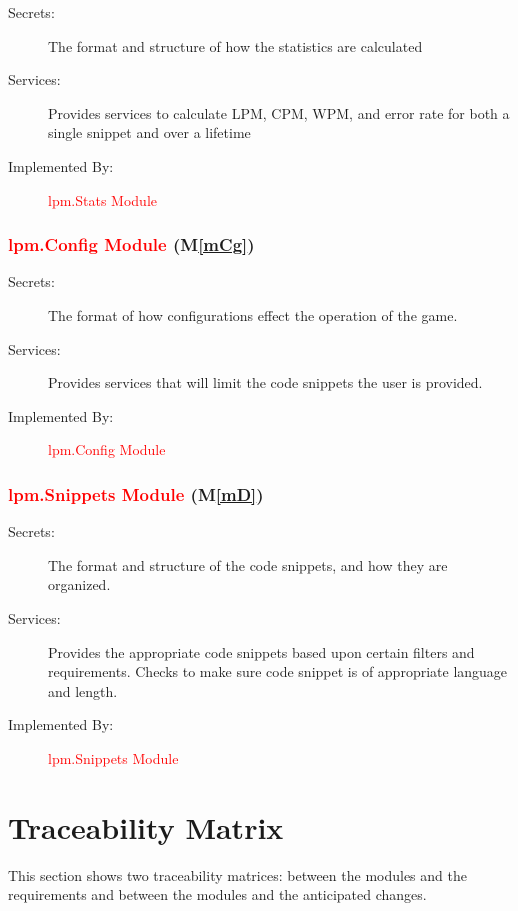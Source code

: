 \documentclass[12pt, titlepage]{article}
\newcommand{\mref}[1]{M\ref{#1}}
\begin{document}
\begin{description}
\item[Secrets:] The format and structure of how the statistics are calculated
\item[Services:] Provides services to calculate LPM, CPM, WPM, and error rate for both a single snippet and over a lifetime
\item[Implemented By:] \textcolor{red}{lpm.Stats Module}
\end{description}

\subsubsection{\textcolor{red}{lpm.Config Module} (\mref{mCg})}

\begin{description}
\item[Secrets:]The format of how configurations effect the operation of the game.
\item[Services:] Provides services that will limit the code snippets the user is provided.
\item[Implemented By:] \textcolor{red}{lpm.Config Module}
\end{description}

\subsubsection{\textcolor{red}{lpm.Snippets Module} (\mref{mD})}

\begin{description}
\item[Secrets:] The format and structure of the code snippets, and how they are organized.
\item[Services:] Provides the appropriate code snippets based upon certain filters and requirements. Checks to make sure code snippet is of appropriate language and length.
\item[Implemented By:] \textcolor{red}{lpm.Snippets Module}
\end{description}

\section{Traceability Matrix} \label{SecTM}

This section shows two traceability matrices: between the modules and the
requirements and between the modules and the anticipated changes.
\end{document}
